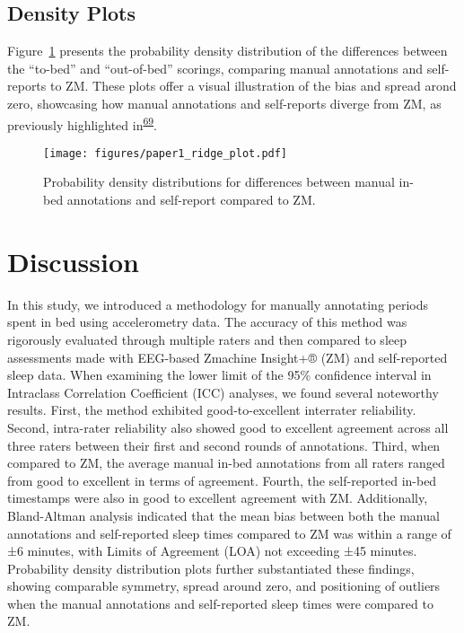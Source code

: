 \documentclass[
  9pt,
]{scrbook}
\begin{document}
\hypertarget{density-plots}{%
\subsection{Density Plots}\label{density-plots}}

Figure~\ref{fig-ridge_plot} presents the probability density
distribution of the differences between the ``to-bed'' and
``out-of-bed'' scorings, comparing manual annotations and self-reports
to ZM. These plots offer a visual illustration of the bias and spread
arond zero, showcasing how manual annotations and self-reports diverge
from ZM, as previously highlighted
in\textsuperscript{\protect\hyperlink{ref-van_hees_estimating_2018}{69}}.

\begin{figure}

{\centering \texttt{[image: figures/paper1\_ridge\_plot.pdf]}

}

\caption{\label{fig-ridge_plot}Probability density distributions for
differences between manual in-bed annotations and self-report compared
to ZM.}

\end{figure}

\hypertarget{discussion}{%
\section{Discussion}\label{discussion}}

In this study, we introduced a methodology for manually annotating
periods spent in bed using accelerometry data. The accuracy of this
method was rigorously evaluated through multiple raters and then
compared to sleep assessments made with EEG-based Zmachine Insight+®
(ZM) and self-reported sleep data. When examining the lower limit of the
95\% confidence interval in Intraclass Correlation Coefficient (ICC)
analyses, we found several noteworthy results. First, the method
exhibited good-to-excellent interrater reliability. Second, intra-rater
reliability also showed good to excellent agreement across all three
raters between their first and second rounds of annotations. Third, when
compared to ZM, the average manual in-bed annotations from all raters
ranged from good to excellent in terms of agreement. Fourth, the
self-reported in-bed timestamps were also in good to excellent agreement
with ZM. Additionally, Bland-Altman analysis indicated that the mean
bias between both the manual annotations and self-reported sleep times
compared to ZM was within a range of ±6 minutes, with Limits of
Agreement (LOA) not exceeding ±45 minutes. Probability density
distribution plots further substantiated these findings, showing
comparable symmetry, spread around zero, and positioning of outliers
when the manual annotations and self-reported sleep times were compared
to ZM.
\end{document}
